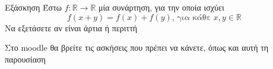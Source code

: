 \documentclass[greek]{beamer}
\begin{document}
\begin{frame}{Εξάσκηση}
 Έστω $f:\mathbb{R}\to\mathbb{R}$ μία συνάρτηση, για την οποία ισχύει
 $$f(x+y)=f(x)+f(y)\text{, για κάθε } x,y\in\mathbb{R}$$
 Να εξετάσετε αν είναι άρτια ή περιττή
\end{frame}

\begin{frame}
 Στο moodle θα βρείτε τις ασκήσεις που πρέπει να κάνετε, όπως και αυτή τη παρουσίαση
\end{frame}
\end{document}
